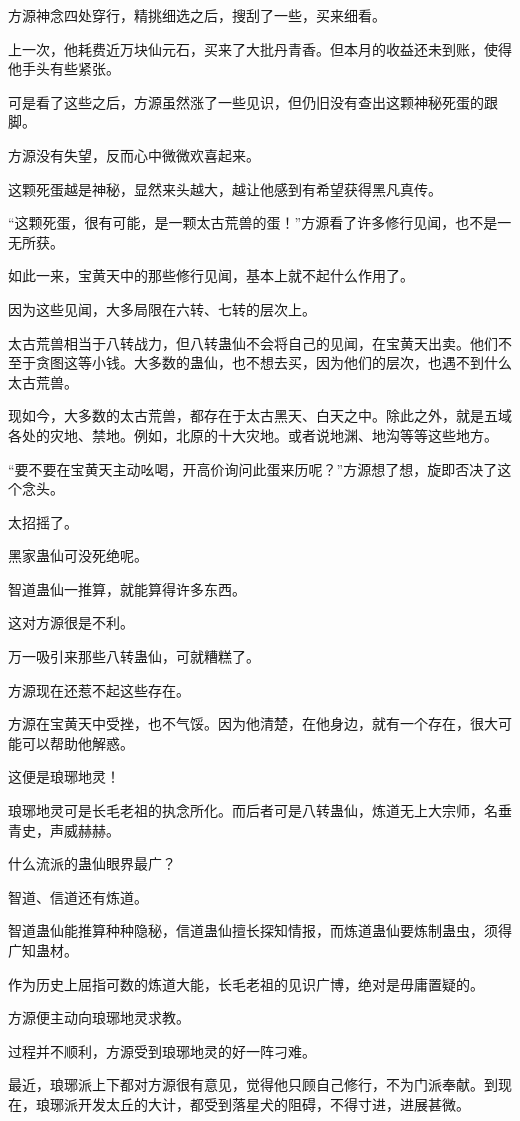 \begin{this_body}
方源神念四处穿行，精挑细选之后，搜刮了一些，买来细看。

上一次，他耗费近万块仙元石，买来了大批丹青香。但本月的收益还未到账，使得他手头有些紧张。

可是看了这些之后，方源虽然涨了一些见识，但仍旧没有查出这颗神秘死蛋的跟脚。

方源没有失望，反而心中微微欢喜起来。

这颗死蛋越是神秘，显然来头越大，越让他感到有希望获得黑凡真传。

“这颗死蛋，很有可能，是一颗太古荒兽的蛋！”方源看了许多修行见闻，也不是一无所获。

如此一来，宝黄天中的那些修行见闻，基本上就不起什么作用了。

因为这些见闻，大多局限在六转、七转的层次上。

太古荒兽相当于八转战力，但八转蛊仙不会将自己的见闻，在宝黄天出卖。他们不至于贪图这等小钱。大多数的蛊仙，也不想去买，因为他们的层次，也遇不到什么太古荒兽。

现如今，大多数的太古荒兽，都存在于太古黑天、白天之中。除此之外，就是五域各处的灾地、禁地。例如，北原的十大灾地。或者说地渊、地沟等等这些地方。

“要不要在宝黄天主动吆喝，开高价询问此蛋来历呢？”方源想了想，旋即否决了这个念头。

太招摇了。

黑家蛊仙可没死绝呢。

智道蛊仙一推算，就能算得许多东西。

这对方源很是不利。

万一吸引来那些八转蛊仙，可就糟糕了。

方源现在还惹不起这些存在。

方源在宝黄天中受挫，也不气馁。因为他清楚，在他身边，就有一个存在，很大可能可以帮助他解惑。

这便是琅琊地灵！

琅琊地灵可是长毛老祖的执念所化。而后者可是八转蛊仙，炼道无上大宗师，名垂青史，声威赫赫。

什么流派的蛊仙眼界最广？

智道、信道还有炼道。

智道蛊仙能推算种种隐秘，信道蛊仙擅长探知情报，而炼道蛊仙要炼制蛊虫，须得广知蛊材。

作为历史上屈指可数的炼道大能，长毛老祖的见识广博，绝对是毋庸置疑的。

方源便主动向琅琊地灵求教。

过程并不顺利，方源受到琅琊地灵的好一阵刁难。

最近，琅琊派上下都对方源很有意见，觉得他只顾自己修行，不为门派奉献。到现在，琅琊派开发太丘的大计，都受到落星犬的阻碍，不得寸进，进展甚微。


\end{this_body}

